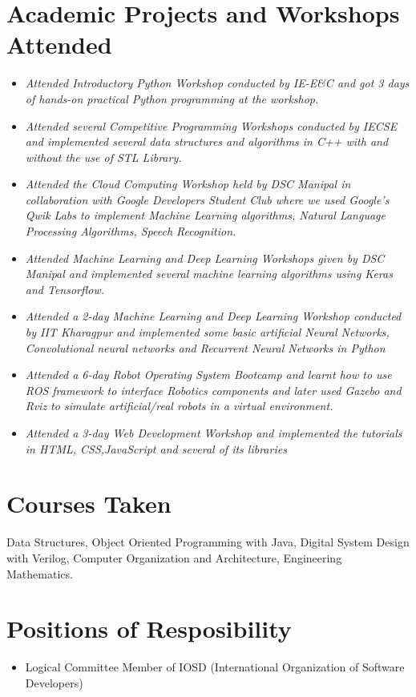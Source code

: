 \documentclass[a4paper,12pt]{article}
\begin{document}
\section*{Academic Projects and Workshops Attended}
\begin{itemize}
    \item{\textit{Attended Introductory Python Workshop conducted by IE-E\&C
    and got 3 days of hands-on practical Python programming at
    the workshop.}}
    \item{\textit{Attended several Competitive Programming Workshops
    conducted by IECSE and implemented several data structures
    and algorithms in C++ with and without the use of STL Library.}}
    \item{\textit{Attended the Cloud Computing Workshop held by DSC
    Manipal in collaboration with Google Developers Student Club
    where we used Google’s Qwik Labs to implement Machine
    Learning algorithms, Natural Language Processing Algorithms,
    Speech Recognition.}}
    \item{\textit{Attended Machine Learning and Deep Learning Workshops
    given by DSC Manipal and implemented several machine
    learning algorithms using Keras and Tensorflow. }}
    \item{\textit{Attended a 2-day Machine Learning and Deep Learning Workshop 
    conducted by IIT Kharagpur and implemented some basic artificial Neural Networks,
    Convolutional neural networks and Recurrent Neural Networks in Python }}
    \item{\textit{Attended a 6-day Robot Operating System Bootcamp and
    learnt how to use ROS framework to interface Robotics
    components and later used Gazebo and Rviz to simulate
    artificial/real robots in a virtual environment.}}
    \item{\textit{Attended a 3-day Web Development Workshop and implemented 
    the tutorials in HTML, CSS,JavaScript and several of its libraries}}
\end{itemize}

\section*{Courses Taken}
Data Structures,
Object Oriented Programming with Java,
Digital System Design with Verilog,
Computer Organization and Architecture,
Engineering Mathematics. 

\section*{Positions of Resposibility}
    \begin{itemize}
        \item Logical Committee Member of IOSD
        (International Organization of Software Developers)
        
    \end{itemize}
\end{document}

